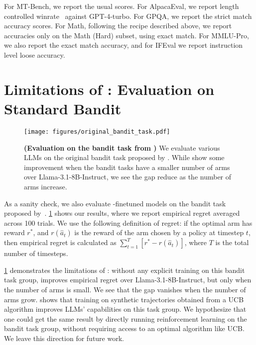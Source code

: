 For MT-Bench, we report the usual scores. For AlpacaEval, we report length controlled winrate~\cite{dubois2024length} against GPT-4-turbo. For GPQA, we report the strict match accuracy scores. For Math, following the recipe described above, we report accuracies only on the Math (Hard) subset, using exact match. For MMLU-Pro, we also report the exact match accuracy, and for IFEval we report instruction level loose accuracy.


\section{Limitations of \ours{}: Evaluation on Standard Bandit}

\begin{figure}[h!]
    \centering
    \texttt{[image: figures/original\_bandit\_task.pdf]}
    \caption{\textbf{(Evaluation on the bandit task from \citet{krishnamurthy2024largelanguagemodelsexplore})} We evaluate various LLMs on the original bandit task proposed by \citet{krishnamurthy2024largelanguagemodelsexplore}. While \ours{} show some improvement when the bandit tasks have a smaller number of arms over Llama-3.1-8B-Instruct, we see the gap reduce as the number of arms increase.}
    \label{fig:original_bandit_task}
\end{figure}

As a sanity check, we also evaluate \ours{}-finetuned models on the bandit task proposed by~\citet{krishnamurthy2024largelanguagemodelsexplore}. \cref{fig:original_bandit_task} shows our results, where we report empirical regret averaged across 100 trials. We use the following definition of regret: if the optimal arm has reward $r^*$, and $r(\hat{a}_t)$ is the reward of the arm chosen by a policy at timestep $t$, then empirical regret is calculated as $\sum_{t = 1}^T \left[r^* - r(\hat{a}_t)\right]$, where $T$ is the total number of timesteps.

\cref{fig:original_bandit_task} demonstrates the limitations of \ours{}: without any explicit training on this bandit task group, \ours{} improves empirical regret over Llama-3.1-8B-Instruct, but only when the number of arms is small. We see that the gap vanishes when the number of arms grow. \citet{nie2024evolveevaluatingoptimizingllms} shows that training on synthetic trajectories obtained from a UCB algorithm improves LLMs' capabilities on this task group. We hypothesize that one could get the same result by directly running reinforcement learning on the bandit task group, without requiring access to an optimal algorithm like UCB. We leave this direction for future work.

